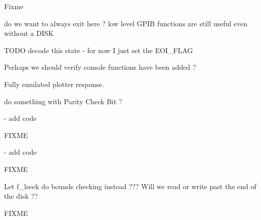 \begin{DoxyRefList}
\label{todo__todo000006}%
%
Fixme  
\item[Global \mbox{\hyperlink{gpib__task_8h_a903eb44d83bf8f2db71e6f32a35fec62}{gpib\+\_\+error\+\_\+test}} (uint16\+\_\+t val)]\label{todo__todo000003}%
%
do we want to always exit here ? low level G\+P\+IB functions are still useful even without a D\+I\+SK  
\item[Global \mbox{\hyperlink{gpib_8h_a67f7cdca85091b3eb0eea0051a200fbe}{gpib\+\_\+read\+\_\+str}} (uint8\+\_\+t $\ast$buf, int size, uint16\+\_\+t $\ast$status)]\label{todo__todo000002}%
%
T\+O\+DO decode this state -\/ for now I just set the E\+O\+I\+\_\+\+F\+L\+AG  
\item[Global \mbox{\hyperlink{posix_8h_a31986cce890109c211ccb14151aafd0e}{isatty}} (int fileno)]\label{todo__todo000049}%
%
Perhaps we should verify console functions have been added ?  
\item[Global \mbox{\hyperlink{printer_8h_a72686fe9d4969430b6ef1f1fe68a6efe}{P\+R\+I\+N\+T\+E\+R\+\_\+\+C\+O\+M\+M\+A\+N\+DS}} (uint8\+\_\+t ch)]\label{todo__todo000007}%
%
Fully emulated plotter response.  
\item[Global \mbox{\hyperlink{ss80_8h_a9efbe3d75e86d4003a9fbf1c8cd69919}{S\+S80\+\_\+\+Amigo\+\_\+\+Clear}} (void)]\label{todo__todo000046}%
%
do something with Parity Check Bit ?  
\item[Global \mbox{\hyperlink{ss80_8h_ab54868f20762a1bb3e57f65fd191e937}{S\+S80\+\_\+\+Cancel}} (void)]\label{todo__todo000047}%
%
-\/ add code 

\label{todo__todo000048}%
%
F\+I\+X\+ME  
\item[Global \mbox{\hyperlink{ss80_8h_ab54868f20762a1bb3e57f65fd191e937}{S\+S80\+\_\+\+Cancel}} (void)]\label{todo__todo000047}%
%
-\/ add code 

\label{todo__todo000048}%
%
F\+I\+X\+ME  
\item[Global \mbox{\hyperlink{ss80_8h_a0d2e3b28c642ea89fea6ff6f8ced5a3b}{S\+S80\+\_\+cmd\+\_\+seek}} (void)]\label{todo__todo000041}%
%
Let f\+\_\+lseek do bounds checking instead ??? Will we read or write past the end of the disk ??  
\item[Global \mbox{\hyperlink{ss80_8h_a98c1da720b6dbe5ee9f13b914a913e17}{S\+S80\+\_\+\+Command\+\_\+\+State}} (void)]\label{todo__todo000014}%
%
F\+I\+X\+ME 


\end{DoxyRefList}

